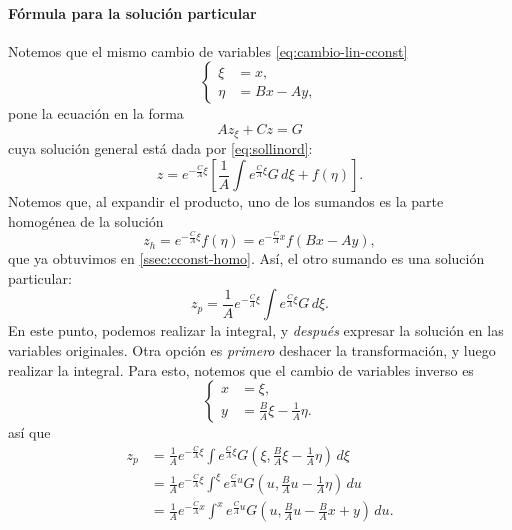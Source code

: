 \documentclass[11pt,letterpaper,draft]{report}
\theoremstyle{plain}
\theoremstyle{definition}
\theoremstyle{remark}
\newcommand\<{\langle}
\renewcommand\>{\rangle}
\begin{document}
\paragraph{Fórmula para la solución particular}
Notemos que el mismo cambio de variables \eqref{eq:cambio-lin-cconst}
\begin{equation}
  \label{eq:cambio-lin-cconst-bis}
  \left\{
    \begin{aligned}
      \xi &= x,
      \\
      \eta &= Bx - Ay,
    \end{aligned}
  \right.
\end{equation}
pone la ecuación en la forma
\begin{equation}
  Az_\xi + Cz = G
\end{equation}
cuya solución general está dada por \eqref{eq:sollinord}:
\begin{equation}
  \label{eq:cconst-sol-abreviada}
  z
  =
  e^{-\frac{C}{A}\xi}
  \left[
    \frac{1}{A}
    \int e^{\frac{C}{A}\xi} G \,d\xi
    +
    f(\eta)
  \right]
.\end{equation}
Notemos que, al expandir el producto, uno de los sumandos
es la parte homogénea de la solución
\begin{equation}
  z_h = e^{-\frac{C}{A}\xi}f(\eta)
  = e^{-\frac{C}{A}x} f(Bx-Ay)
,\end{equation}
que ya obtuvimos en \ref{ssec:cconst-homo}.
Así, el otro sumando es una solución particular:
\begin{equation}
  \label{eq:cconst-sol-part-trans} 
  z_p
  =
  \frac{1}{A}
  e^{-\frac{C}{A}\xi}
  \int e^{\frac{C}{A}\xi} G \,d\xi.
\end{equation}
En este punto, podemos realizar la integral, y \emph{después} expresar
la solución en las variables originales.
Otra opción es \emph{primero}
deshacer la transformación, y luego realizar la integral.
Para esto, notemos que el cambio de variables inverso es
\begin{equation}
  \left\{
    \begin{aligned}
      x &= \xi,
      \\
      y &= \tfrac{B}{A}\xi-\tfrac{1}{A}\eta.
    \end{aligned}
  \right.
\end{equation}
así que
\begin{align}
  z_p
  &=
  \frac{1}{A}e^{-\frac{C}{A}\xi}
  \int
  e^{\frac{C}{A}\xi} G(\xi,\tfrac{B}{A}\xi-\tfrac{1}{A}\eta) \,d\xi
  \\
  &=
  \frac{1}{A}e^{-\frac{C}{A}\xi}
  \int^\xi
  e^{\frac{C}{A}u} G(u,\tfrac{B}{A}u-\tfrac{1}{A}\eta) \,du
  \\
  &= \frac{1}{A}e^{-\frac{C}{A} x}
    \int^x
      e^{\frac{C}{A}u}
      G(u ,\tfrac{B}{A}u-\tfrac{B}{A}x+y)
    \, du
    \label{eq:cconst-solpart}
.\end{align}
\end{document}
